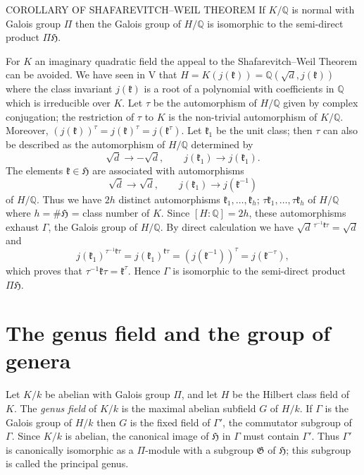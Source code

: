 \begin{namedstmt}{COROLLARY OF SHAFAREVITCH--WEIL THEOREM}
If $K/\mathbb{Q}$ is normal with Galois group $\Pi$ then the Galois group
of $H/\mathbb{Q}$ is isomorphic to the semi-direct product
$\Pi\mathfrak{H}$.
\end{namedstmt}

For $K$ an imaginary quadratic field the appeal to the
Shafarevitch--Weil Theorem can be avoided. We have seen in V that
$H=K(j(\mathfrak{k}))=\mathbb{Q}(\sqrt{d},j(\mathfrak{k}))$ where the
class invariant $j(\mathfrak{k})$ is a root of a polynomial with
coefficients in $\mathbb{Q}$ which is irreducible over $K$. Let $\tau$ be
the automorphism of $H/\mathbb{Q}$ given by complex conjugation; the
restriction of $\tau$ to $K$ is the non-trivial automorphism of
$K/\mathbb{Q}$. Moreover, $(j(\mathfrak{k}))^{\tau}
=j(\mathfrak{k})^{\tau}=j(\mathfrak{k}^{\tau})$. Let $\mathfrak{k}_{1}$
be the unit class; then $\tau$ can also be described as the automorphism
of $H/\mathbb{Q}$ determined by
\[
\sqrt{d}\rightarrow-\sqrt{d},\qquad j(\mathfrak{k}_{1})
\rightarrow j(\mathfrak{k}_{1}).
\]
The elements $\mathfrak{k}\in\mathfrak{H}$ are associated with
automorphisms
\[
\sqrt{d}\rightarrow\sqrt{d},\qquad j(\mathfrak{k}_{1})
\rightarrow j(\mathfrak{k}^{-1})
\]
of $H/\mathbb{Q}$. Thus we have $2h$ distinct automorphisms
$\mathfrak{k}_{1},\ldots,\mathfrak{k}_{h}$;
$\tau\mathfrak{k}_{1},\ldots,\tau\mathfrak{k}_{h}$ of $H/\mathbb{Q}$
where $h=\#\mathfrak{H}$ = class number of $K$. Since
$[H:\mathbb{Q}]=2h$, these automorphisms exhaust $\Gamma$, the Galois
group of $H/\mathbb{Q}$. By direct calculation we have
$\sqrt{d}{}^{\,\tau^{-1}\mathfrak{k}\tau}=\sqrt{d}$ and
\[
j(\mathfrak{k}_{1})^{\tau^{-1}\mathfrak{k}\tau}
=j(\mathfrak{k}_{1})^{\mathfrak{k}\tau}
=(j(\mathfrak{k}^{-1}))^{\tau}
=j(\mathfrak{k}^{-\tau}),
\]
which proves that $\tau^{-1}\mathfrak{k}\tau=\mathfrak{k}^{\tau}$. Hence
$\Gamma$ is isomorphic to the semi-direct product $\Pi\mathfrak{H}$.

\section{The genus field and the group of genera}\label{sec:VII-genus}

Let $K/k$ be abelian with Galois group $\Pi$, and let $H$ be the Hilbert
class field of $K$. The \emph{genus field} of $K/k$ is the maximal
abelian subfield $G$ of $H/k$. If $\Gamma$ is the Galois group of $H/k$
then $G$ is the fixed field of $\Gamma'$, the commutator subgroup of
$\Gamma$. Since $K/k$ is abelian, the canonical image of $\mathfrak{H}$
in $\Gamma$ must contain $\Gamma'$. Thus $\Gamma'$ is canonically
isomorphic as a $\Pi$-module with a subgroup $\mathfrak{G}$ of
$\mathfrak{H}$; this subgroup is called the principal genus.

